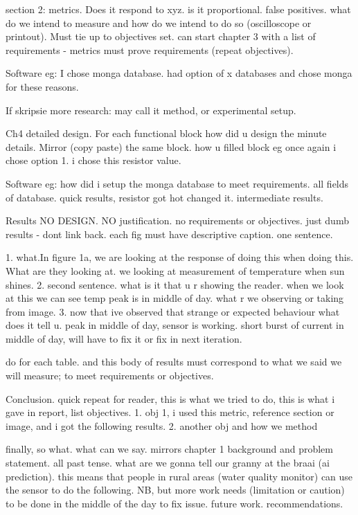 section 2: metrics. Does it respond to xyz. is it proportional. false positives. what do we intend to measure and how do we intend to do so (oscilloscope or printout). Must tie up to objectives set. can start chapter 3 with a list of requirements - metrics must prove requirements (repeat objectives).

Software eg: I chose monga database. had option of x databases and chose monga for these reasons. 

If skripsie more research:
may call it method, or experimental setup. 

Ch4
detailed design. For each functional block how did u design the minute details. Mirror (copy paste) the same block. how u filled block eg once again i chose option 1. i chose this resistor value. 

Software eg: how did i setup the monga database to meet requirements. all fields of database. 
quick results, resistor got hot changed it. intermediate results. 


Results
NO DESIGN. NO justification. no requirements or objectives. just dumb results - dont link back. each fig must have descriptive caption. one sentence. 

1. what.In figure 1a,  we are looking at the response of doing this when doing this. What are they looking at. we looking at measurement of temperature when sun shines. 
2. second sentence. what is it that u r showing the reader. when we look at this we can see temp peak is in middle of day. what r we observing or taking from image. 
3. now that ive observed that strange or expected behaviour what does it tell u. peak in middle of day, sensor is working. short burst of current in middle of day, will have to fix it or fix in next iteration. 

do for each table. and this body of results must correspond to what we said we will measure; to meet requirements or objectives. 

Conclusion. 
quick repeat for reader, this is what we tried to do, this is what i gave in report, 
list objectives. 
1. obj 1, i used this metric, reference section or image, and i got the following results.
2. another obj and how we method

finally, so what. what can we say. mirrors chapter 1 background and problem statement. all past tense. what are we gonna tell our granny at the braai (ai prediction). this means that people in rural areas (water quality monitor) can use the sensor to do the following. NB, but more work needs (limitation or caution) to be done in the middle of the day to fix issue. 
future work. recommendations. 

